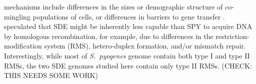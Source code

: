 \documentclass[12pt]{article}
\begin{document}
mechanisms include differences in the sizes or demographic structure of
co-mingling populations of cells, or differences in barriers to gene
transfer \citep{Thomas2005}.  \cite{Kalia2001} speculated that 
SDE might be inherently less capable than SPY to acquire DNA by homologous
recombination, for example, due to differences in the 
restriction-modification system (RMS), hetero-duplex formation, and/or mismatch
repair.  
Interestingly,
while most of \textit{S.\ pyogenes} genome contain both type I and type II
RMSs, the two SDE genomes studied here contain
only type II RMSs.  (CHECK: THIS NEEDS SOME WORK)







\end{document}
